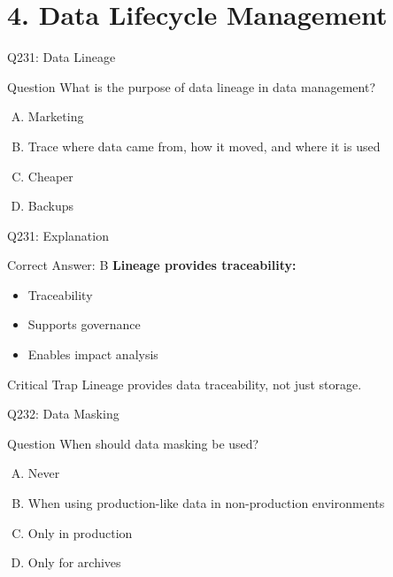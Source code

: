 \documentclass{beamer}
\begin{document}
	\section{4. Data Lifecycle Management}
	
	\begin{frame}{Q231: Data Lineage}
		\begin{block}{Question}
			What is the purpose of data lineage in data management?
		\end{block}
		\begin{enumerate}[(A)]
			\item Marketing
			\item Trace where data came from, how it moved, and where it is used
			\item Cheaper
			\item Backups
		\end{enumerate}
	\end{frame}
	
	\begin{frame}{Q231: Explanation}
		\begin{block}{Correct Answer: B}
			\textbf{Lineage provides traceability:}
			\begin{itemize}
				\item Traceability
				\item Supports governance
				\item Enables impact analysis
			\end{itemize}
		\end{block}
		\begin{alertblock}{Critical Trap}
			Lineage provides data traceability, not just storage.
		\end{alertblock}
	\end{frame}
	
	\begin{frame}{Q232: Data Masking}
		\begin{block}{Question}
			When should data masking be used?
		\end{block}
		\begin{enumerate}[(A)]
			\item Never
			\item When using production-like data in non-production environments
			\item Only in production
			\item Only for archives
		\end{enumerate}
	\end{frame}
	
\end{document}
